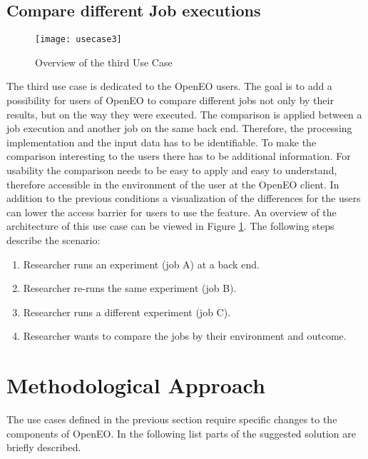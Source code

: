 \documentclass[draft,final]{vutinfth} %
\begin{document}
\subsection{Compare different Job executions}\label{UseCase3}
\begin{figure}[h]
	\centering
	\texttt{[image: usecase3]}
	\caption{Overview of the third Use Case}
	\label{fig:usecase3} %
\end{figure}
The third use case is dedicated to the OpenEO users. The goal is to add a possibility for users of OpenEO to compare different jobs not only by their results, but on the way they were executed. The comparison is applied between a job execution and another job on the same back end. Therefore, the processing implementation and the input data has to be identifiable. To make the comparison interesting to the users there has to be additional information. For usability the comparison needs to be easy to apply and easy to understand, therefore accessible in the environment of the user at the OpenEO client. In addition to the previous conditions a visualization of the differences for the users can lower the access barrier for users to use the feature. An overview of the architecture of this use case can be viewed in Figure \ref{fig:usecase3}.
The following steps describe the scenario:
\begin{enumerate}
	\item Researcher runs an experiment (job A) at a back end.
	\item Researcher re-runs the same experiment (job B).
	\item Researcher runs a different experiment (job C).   
	\item Researcher wants to compare the jobs by their environment and outcome.
\end{enumerate}

\section{Methodological Approach}\label{Method}
The use cases defined in the previous section require specific changes to the components of OpenEO. In the following list parts of the suggested solution are briefly described. 
\end{document}
